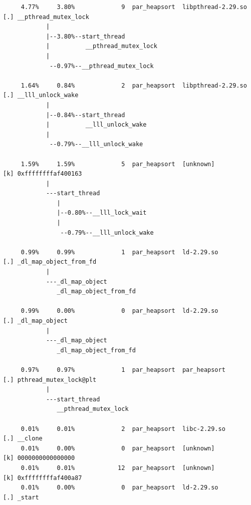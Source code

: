 \documentclass{article}
\begin{document}
\begin{verbatim}
     4.77%     3.80%             9  par_heapsort  libpthread-2.29.so  [.] __pthread_mutex_lock
            |
            |--3.80%--start_thread
            |          __pthread_mutex_lock
            |
             --0.97%--__pthread_mutex_lock

     1.64%     0.84%             2  par_heapsort  libpthread-2.29.so  [.] __lll_unlock_wake
            |
            |--0.84%--start_thread
            |          __lll_unlock_wake
            |
             --0.79%--__lll_unlock_wake

     1.59%     1.59%             5  par_heapsort  [unknown]           [k] 0xffffffffaf400163
            |
            ---start_thread
               |
               |--0.80%--__lll_lock_wait
               |
                --0.79%--__lll_unlock_wake

     0.99%     0.99%             1  par_heapsort  ld-2.29.so          [.] _dl_map_object_from_fd
            |
            ---_dl_map_object
               _dl_map_object_from_fd

     0.99%     0.00%             0  par_heapsort  ld-2.29.so          [.] _dl_map_object
            |
            ---_dl_map_object
               _dl_map_object_from_fd

     0.97%     0.97%             1  par_heapsort  par_heapsort        [.] pthread_mutex_lock@plt
            |
            ---start_thread
               __pthread_mutex_lock

     0.01%     0.01%             2  par_heapsort  libc-2.29.so        [.] __clone
     0.01%     0.00%             0  par_heapsort  [unknown]           [k] 0000000000000000
     0.01%     0.01%            12  par_heapsort  [unknown]           [k] 0xffffffffaf400a87
     0.01%     0.00%             0  par_heapsort  ld-2.29.so          [.] _start
\end{verbatim}
\normalsize
\end{document}
